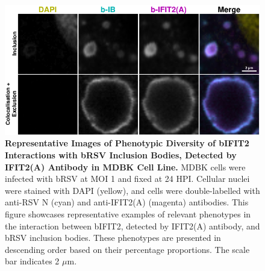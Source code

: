 \begin{figure}
    \centering
    \includegraphics[width=1\linewidth]{08. Chapter 3/Figs/02. Infection/02. IFIT2/01. IFIT2A/15. i2a mdbk brsv.pdf} 
    \caption[Representative Images of Phenotypic Diversity of bIFIT2 Interactions with bRSV Inclusion Bodies, Detected by IFIT2(A) Antibody in MDBK Cell Line.]{\textbf{Representative Images of Phenotypic Diversity of bIFIT2 Interactions with bRSV Inclusion Bodies, Detected by IFIT2(A) Antibody in MDBK Cell Line.} MDBK cells were infected with bRSV at MOI 1 and fixed at 24 HPI. Cellular nuclei were stained with DAPI (yellow), and cells were double-labelled with anti-RSV N (cyan) and anti-IFIT2(A) (magenta) antibodies. This figure showcases representative examples of relevant phenotypes in the interaction between bIFIT2, detected by IFIT2(A) antibody, and bRSV inclusion bodies. These phenotypes are presented in descending order based on their percentage proportions. The scale bar indicates 2 \(\mu \mbox{m}\).}
    \label{fig:Representative Images of Phenotypic Diversity of bIFIT2 Interactions with bRSV Inclusion Bodies, Detected by IFIT2(A) Antibody in MDBK Cell Line}
\end{figure}

